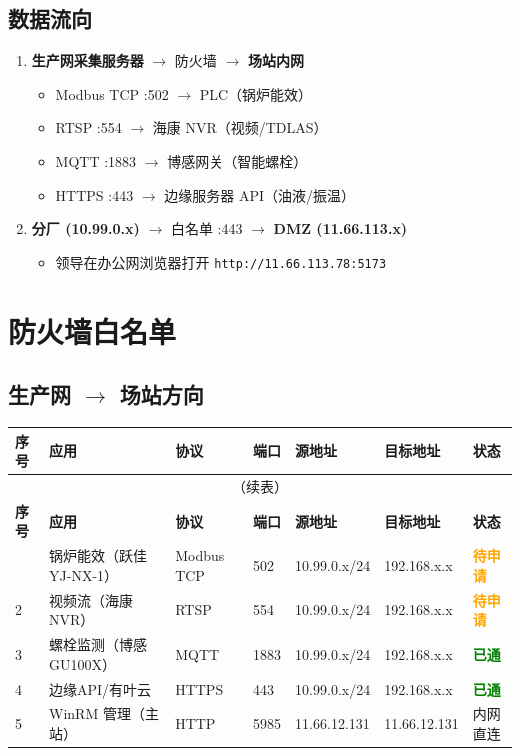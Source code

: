 \documentclass[12pt,a4paper]{ctexart}
\newcommand{\statusok}{\textcolor{green}{\textbf{已通}}}
\newcommand{\statuspending}{\textcolor{orange}{\textbf{待申请}}}
\begin{document}
\subsection{数据流向}

\begin{enumerate}[leftmargin=*]
  \item \textbf{生产网采集服务器} $\longrightarrow$ 防火墙 $\longrightarrow$ \textbf{场站内网}
  \begin{itemize}
    \item Modbus TCP :502 $\longrightarrow$ PLC（锅炉能效）
    \item RTSP :554 $\longrightarrow$ 海康 NVR（视频/TDLAS）
    \item MQTT :1883 $\longrightarrow$ 博感网关（智能螺栓）
    \item HTTPS :443 $\longrightarrow$ 边缘服务器 API（油液/振温）
  \end{itemize}
  \item \textbf{分厂 (10.99.0.x)} $\longrightarrow$ 白名单 :443 $\longrightarrow$ \textbf{DMZ (11.66.113.x)}
  \begin{itemize}
    \item 领导在办公网浏览器打开 \texttt{http://11.66.113.78:5173}
  \end{itemize}
\end{enumerate}

\section{防火墙白名单}

\subsection{生产网 $\rightarrow$ 场站方向}

\begin{longtable}{p{0.7cm} p{2.2cm} p{1.2cm} p{0.8cm} p{2.5cm} p{2.5cm} p{1.5cm}}
\toprule
\textbf{序号} & \textbf{应用} & \textbf{协议} & \textbf{端口} & \textbf{源地址} & \textbf{目标地址} & \textbf{状态} \\
\midrule
\endfirsthead
\multicolumn{7}{c}{\small（续表）} \\
\toprule
\textbf{序号} & \textbf{应用} & \textbf{协议} & \textbf{端口} & \textbf{源地址} & \textbf{目标地址} & \textbf{状态} \\
\midrule
\endhead
\bottomrule
\endfoot
1 & 锅炉能效（跃佳 YJ-NX-1） & Modbus TCP & 502 & 10.99.0.x/24 & 192.168.x.x & \statuspending \\
2 & 视频流（海康 NVR） & RTSP & 554 & 10.99.0.x/24 & 192.168.x.x & \statuspending \\
3 & 螺栓监测（博感 GU100X） & MQTT & 1883 & 10.99.0.x/24 & 192.168.x.x & \statusok \\
4 & 边缘API/有叶云 & HTTPS & 443 & 10.99.0.x/24 & 192.168.x.x & \statusok \\
5 & WinRM 管理（主站） & HTTP & 5985 & 11.66.12.131 & 11.66.12.131 & 内网直连 \\
\end{longtable}
\end{document}
